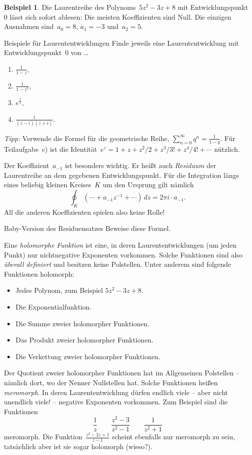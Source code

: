 \documentclass[twoside]{../zirkelblatt1415}
\theoremstyle{definition}
\newtheorem{bsp}[defn]{Beispiel}
\theoremstyle{plain}
\theoremstyle{remark}
\begin{document}
\begin{bsp}Die Laurentreihe des Polynoms~$5 z^2 - 3z + 8$ mit
Entwicklungspunkt~$0$ lässt sich sofort ablesen: Die meisten Koeffizienten sind
Null. Die einzigen Ausnahmen sind~$a_0 = 8$, $a_1 = -3$ und~$a_2 = 5$.\end{bsp}

\begin{aufgabe}{Beispiele für Laurententwicklungen}
Finde jeweils eine Laurententwicklung mit Entwicklungspunkt~$0$ von \ldots
\begin{enumerate}
\item $\frac{1}{1 - z}$,
\item $\frac{1}{1 - z^2}$,
\item $e^{\frac{1}{z}}$,
\item $\frac{1}{(z - i) (z + i)}$.
\end{enumerate}
\emph{Tipp:} Verwende die Formel für die geometrische Reihe, $\sum_{n=0}^\infty
q^n = \frac{1}{1 - q}$. Für Teilaufgabe~c) ist die Identität~$e^z = 1 + z + z^2/2 +
z^3/3! + z^4/4! + \cdots$ nützlich.
\end{aufgabe}

Der Koeffizient~$a_{-1}$ ist besonders wichtig. Er heißt auch \emph{Residuum}
der Laurentreihe an dem gegebenen Entwicklungspunkt. Für die Integration längs
eines beliebig kleinen Kreises~$K$ um den Ursprung gilt nämlich
\[ \oint_K (\cdots + a_{-1} z^{-1} + \cdots) \,dz = 2\pi i \cdot a_{-1}. \]
All die anderen Koeffizienten spielen also keine Rolle!

\begin{aufgabe}{Baby-Version des Residuensatzes}\label{aufg:residuensatz-baby}
Beweise diese Formel.
\end{aufgabe}

Eine \emph{holomorphe Funktion} ist eine, in deren Laurententwicklungen (um
jeden Punkt) nur nichtnegative Exponenten vorkommen. Solche Funktionen sind
also \emph{überall definiert} und besitzen keine Polstellen. Unter anderem sind
folgende Funktionen holomorph:
\begin{itemize}
\item Jedes Polynom, zum Beispiel $5z^2 - 3z + 8$.
\item Die Exponentialfunktion.
\item Die Summe zweier holomorpher Funktionen.
\item Das Produkt zweier holomorpher Funktionen.
\item Die Verkettung zweier holomorpher Funktionen.
\end{itemize}
Der Quotient zweier holomorpher Funktionen hat im Allgemeinen Polstellen
-- nämlich dort, wo der Nenner Nullstellen hat. Solche Funktionen heißen
\emph{meromorph}. In deren Laurententwicklung dürfen endlich viele -- aber
nicht unendlich viele! -- negative Exponenten vorkommen. Zum Beispiel sind die
Funktionen
\[ \frac{1}{z} \qquad \frac{z^2 - 3}{z^2 - 1} \qquad \frac{1}{z^2 + 1} \]
meromorph. Die Funktion~$\frac{z^2 - 2z + 1}{z - 1}$ scheint ebenfalls nur
meromorph zu sein, tatsächlich aber ist sie sogar holomorph (wieso?).
\end{document}
